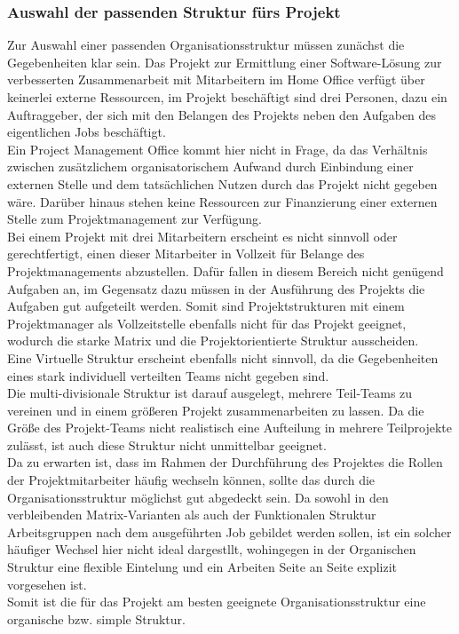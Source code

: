 \documentclass[ThesisDJ.tex]{subfiles}
\begin{document}
\subsubsection{Auswahl der passenden Struktur fürs Projekt}
Zur Auswahl einer passenden Organisationsstruktur müssen zunächst die Gegebenheiten klar sein. Das Projekt zur Ermittlung einer Software-Lösung zur verbesserten Zusammenarbeit mit Mitarbeitern im Home Office verfügt über keinerlei externe Ressourcen, im Projekt beschäftigt sind drei Personen, dazu ein Auftraggeber, der sich mit den Belangen des Projekts neben den Aufgaben des eigentlichen Jobs beschäftigt.\\
Ein Project Management Office kommt hier nicht in Frage, da das Verhältnis zwischen zusätzlichem organisatorischem Aufwand durch Einbindung einer externen Stelle und dem tatsächlichen Nutzen durch das Projekt nicht gegeben wäre. Darüber hinaus stehen keine Ressourcen zur Finanzierung einer externen Stelle zum Projektmanagement zur Verfügung.\\
Bei einem Projekt mit drei Mitarbeitern erscheint es nicht sinnvoll oder gerechtfertigt, einen dieser Mitarbeiter in Vollzeit für Belange des Projektmanagements abzustellen. Dafür fallen in diesem Bereich nicht genügend Aufgaben an, im Gegensatz dazu müssen in der Ausführung des Projekts die Aufgaben gut aufgeteilt werden. Somit sind Projektstrukturen mit einem Projektmanager als Vollzeitstelle ebenfalls nicht für das Projekt geeignet, wodurch die starke Matrix und die Projektorientierte Struktur ausscheiden.\\
Eine Virtuelle Struktur erscheint ebenfalls nicht sinnvoll, da die Gegebenheiten eines stark individuell verteilten Teams nicht gegeben sind.\\
Die multi-divisionale Struktur ist darauf ausgelegt, mehrere Teil-Teams zu vereinen und in einem größeren Projekt zusammenarbeiten zu lassen. Da die Größe des Projekt-Teams nicht realistisch eine Aufteilung in mehrere Teilprojekte zulässt, ist auch diese Struktur nicht unmittelbar geeignet.\\
Da zu erwarten ist, dass im Rahmen der Durchführung des Projektes die Rollen der Projektmitarbeiter häufig wechseln können, sollte das durch die Organisationsstruktur möglichst gut abgedeckt sein. Da sowohl in den verbleibenden Matrix-Varianten als auch der Funktionalen Struktur Arbeitsgruppen nach dem ausgeführten Job gebildet werden sollen, ist ein solcher häufiger Wechsel hier nicht ideal dargestllt, wohingegen in der Organischen Struktur eine flexible Eintelung und ein Arbeiten Seite an Seite explizit vorgesehen ist.\\
Somit ist die für das Projekt am besten geeignete Organisationsstruktur eine organische bzw. simple Struktur.
\end{document}
